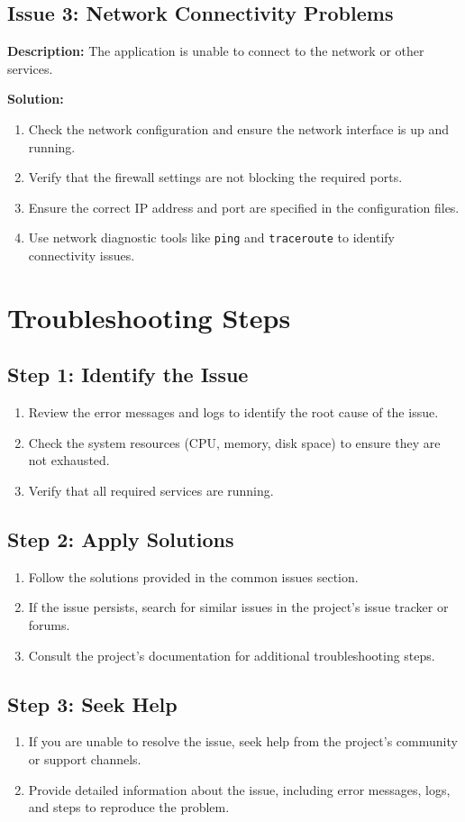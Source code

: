 \documentclass{article}
\begin{document}
\subsection{Issue 3: Network Connectivity Problems}
\textbf{Description:} The application is unable to connect to the network or other services.

\textbf{Solution:}
\begin{enumerate}
    \item Check the network configuration and ensure the network interface is up and running.
    \item Verify that the firewall settings are not blocking the required ports.
    \item Ensure the correct IP address and port are specified in the configuration files.
    \item Use network diagnostic tools like \texttt{ping} and \texttt{traceroute} to identify connectivity issues.
\end{enumerate}

\section{Troubleshooting Steps}
\subsection{Step 1: Identify the Issue}
\begin{enumerate}
    \item Review the error messages and logs to identify the root cause of the issue.
    \item Check the system resources (CPU, memory, disk space) to ensure they are not exhausted.
    \item Verify that all required services are running.
\end{enumerate}

\subsection{Step 2: Apply Solutions}
\begin{enumerate}
    \item Follow the solutions provided in the common issues section.
    \item If the issue persists, search for similar issues in the project's issue tracker or forums.
    \item Consult the project's documentation for additional troubleshooting steps.
\end{enumerate}

\subsection{Step 3: Seek Help}
\begin{enumerate}
    \item If you are unable to resolve the issue, seek help from the project's community or support channels.
    \item Provide detailed information about the issue, including error messages, logs, and steps to reproduce the problem.
\end{enumerate}
\end{document}
